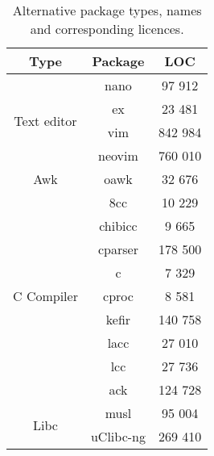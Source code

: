 
\newpage

\begin{table}[!ht]
    \centering
    \begin{tabular}{|c|c|c|}
        \hline
        Type & Package & LOC \\
        \hline
        \hline
        \multirow{4}{*}{Text editor} & nano \cite{nano} & 97 912 \\
        \cline{2-3}
        & ex \cite{ex-vi} \footnotemark & 23 481 \\
        \cline{2-3}
        & vim \cite{vim} & 842 984 \\
        \cline{2-3}
        & neovim \cite{neovim} & 760 010 \\
        \hline
        \hline
        Awk & oawk \cite{oawk} & 32 676 \\
        \hline
        \hline
        \multirow{9}{*}{C Compiler} & 8cc \cite{8cc} & 10 229 \\
        \cline{2-3}
        & chibicc \cite{chibicc} & 9 665 \\
        \cline{2-3}
        & cparser \cite{cparser} & 178 500 \\
        \cline{2-3}
        & c \cite{c} & 7 329 \\
        \cline{2-3}
        & cproc \cite{cproc} & 8 581 \\
        \cline{2-3}
        & kefir \cite{kefir} & 140 758 \\
        \cline{2-3}
        & lacc \cite{lacc} & 27 010 \\
        \cline{2-3}
        & lcc \cite{lcc} \footnotemark & 27 736 \\
        \cline{2-3}
        & ack \cite{ack} & 124 728 \\
        \hline
        \hline
        \multirow{2}{*}{Libc} & musl \cite{musl} & 95 004 \\
        \cline{2-3}
        & uClibc-ng \cite{uclibc-ng} & 269 410 \\
        \hline
    \end{tabular}
    \caption{Alternative package types, names and corresponding licences.}
\end{table}


\newpage
